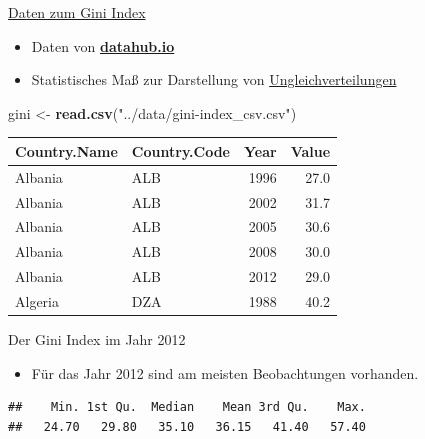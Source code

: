 \documentclass[ignorenonframetext,]{beamer}
\newenvironment{Shaded}{\begin{snugshade}}{\end{snugshade}}
\newcommand{\DecValTok}[1]{\textcolor[rgb]{0.00,0.00,0.81}{#1}}
\newcommand{\KeywordTok}[1]{\textcolor[rgb]{0.13,0.29,0.53}{\textbf{#1}}}
\newcommand{\NormalTok}[1]{#1}
\newcommand{\OperatorTok}[1]{\textcolor[rgb]{0.81,0.36,0.00}{\textbf{#1}}}
\newcommand{\StringTok}[1]{\textcolor[rgb]{0.31,0.60,0.02}{#1}}
\providecommand{\tightlist}{%
  \setlength{\itemsep}{0pt}\setlength{\parskip}{0pt}}
\begin{document}
\begin{frame}[fragile]{\href{https://datahub.io/core/gini-index\#data}{Daten
zum Gini Index}}
\protect\hypertarget{daten-zum-gini-index}{}

\begin{itemize}
\tightlist
\item
  Daten von
  \href{https://datahub.io/core/gini-index\#data}{\textbf{datahub.io}}
\item
  Statistisches Maß zur Darstellung von
  \href{https://de.wikipedia.org/wiki/Gini-Koeffizient}{Ungleichverteilungen}
\end{itemize}

\begin{Shaded}
\begin{Highlighting}[]
\NormalTok{gini <-}\StringTok{ }\KeywordTok{read.csv}\NormalTok{(}\StringTok{"../data/gini-index_csv.csv"}\NormalTok{)}
\end{Highlighting}
\end{Shaded}

\begin{longtable}[]{@{}llrr@{}}
\toprule
Country.Name & Country.Code & Year & Value\tabularnewline
\midrule
\endhead
Albania & ALB & 1996 & 27.0\tabularnewline
Albania & ALB & 2002 & 31.7\tabularnewline
Albania & ALB & 2005 & 30.6\tabularnewline
Albania & ALB & 2008 & 30.0\tabularnewline
Albania & ALB & 2012 & 29.0\tabularnewline
Algeria & DZA & 1988 & 40.2\tabularnewline
\bottomrule
\end{longtable}

\end{frame}

\begin{frame}[fragile]{Der Gini Index im Jahr 2012}
\protect\hypertarget{der-gini-index-im-jahr-2012}{}

\begin{itemize}
\tightlist
\item
  Für das Jahr 2012 sind am meisten Beobachtungen vorhanden.
\end{itemize}

\begin{Shaded}
\end{Shaded}

\begin{verbatim}
##    Min. 1st Qu.  Median    Mean 3rd Qu.    Max. 
##   24.70   29.80   35.10   36.15   41.40   57.40
\end{verbatim}

\end{frame}
\end{document}
